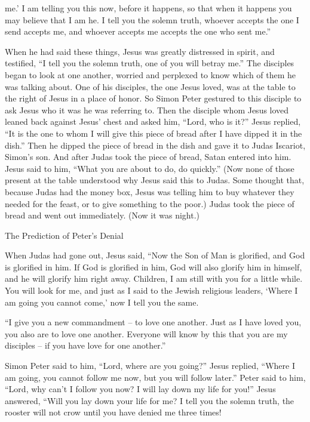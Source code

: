 {me.’
I am telling
you
this now,
before
it happens,
so that
when
it happens
you may believe
that
I
am he.
I tell
you
the solemn truth,
whoever
accepts
the one
I send
accepts
me,
and
whoever accepts
me
accepts
the one who sent
me.”
\par }{\PP {}When
he had said
these things,
Jesus
was greatly distressed
in spirit,
and
testified, “I tell
you
the solemn truth,
one
of
you
will betray
me.”
The disciples
began to look at
one another,
worried and perplexed
to know which of them
he was talking about.
One
of
his
disciples,
the one Jesus
loved,
was
at the table
to the right of Jesus
in
a place of honor.
So
Simon
Peter
gestured
to this
disciple to ask
Jesus
who
it was
he was
referring to.
Then
the disciple whom Jesus loved
leaned back
against
Jesus’
chest
and asked
him,
“Lord,
who
is it?”
Jesus
replied, “It is
the one to whom
I
will give
this piece of bread
after I have dipped
it in the dish.” Then he dipped
the piece of bread
in the dish and
gave
it to Judas
Iscariot,
Simon’s son.
And
after
Judas took the piece of bread,
Satan
entered
into
him.
Jesus
said
to him, “What you are about to do,
do
quickly.”
(Now
none
of those
present at the table
understood
why
Jesus said
this to Judas.
Some
thought
that,
because
Judas
had
the money box,
Jesus
was telling
him
to buy
whatever
they needed
for
the feast,
or
to
give
something
to the poor.)
Judas took
the piece of bread
and went out
immediately.
(Now
it was
night.)
\par }{\SH The Prediction of Peter’s Denial
\par }{\PP {}When
Judas had gone out,
Jesus
said,
“Now
the Son
of Man
is glorified,
and
God
is glorified
in
him.
If God
is glorified in him, God will
also
glorify
him
in
himself,
and
he will glorify
him
right away.
Children,
I am
still
with
you
for a little while.
You will look for
me,
and
just as
I said
to the Jewish religious leaders, ‘Where
I
am going
you
cannot
come,’
now
I tell
you the same.
\par }{\PP {}“I give
you
a new
commandment
– to
love
one another.
Just as
I have loved
you,
you
also
are
to
love
one another.
Everyone
will know
by
this
that
you are
my
disciples
– if
you have
love
for
one another.”
\par }{\PP {}Simon
Peter
said
to him,
“Lord,
where
are you going?” Jesus
replied, “Where
I am going,
you cannot
follow
me
now,
but
you will follow
later.”
Peter
said
to him,
“Lord,
why
can’t
I follow
you
now? I will lay down
my
life
for
you!”
Jesus
answered,
“Will you lay down
your
life
for
me? I tell
you
the solemn truth,
the rooster
will
not
crow
until
you have denied
me
three times!

}
